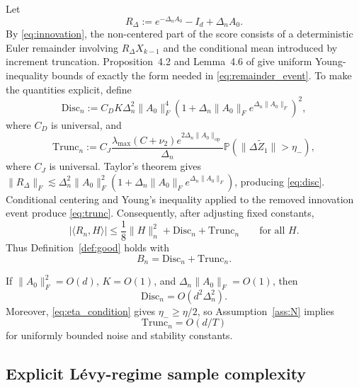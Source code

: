 \documentclass[12pt]{article}
\theoremstyle{definition}
\begin{document}
	Let
	\begin{equation}
		R_\Delta:=e^{-\Delta_nA_0}-I_d+\Delta_nA_0.
		\label{eq:Rdelta}
	\end{equation}
	By \eqref{eq:innovation}, the non-centered part of the score consists of a deterministic Euler remainder involving $R_\Delta X_{k-1}$ and the conditional mean introduced by increment truncation. Proposition~4.2 and Lemma~4.6 of \citet{DexheimerJeszka2026} give uniform Young-inequality bounds of exactly the form needed in \eqref{eq:remainder_event}. To make the quantities explicit, define
	\begin{equation}
		\mathrm{Disc}_n
		:=C_D K\Delta_n^2\|A_0\|_F^4
		\left(1+\Delta_n\|A_0\|_F e^{\Delta_n\|A_0\|_F}\right)^2,
		\label{eq:disc}
	\end{equation}
	where $C_D$ is universal, and
	\begin{equation}
		\mathrm{Trunc}_n
		:=C_J\frac{\lambda_{\max}(C+\nu_2)e^{2\Delta_n\|A_0\|_{\mathrm{op}}}}{\Delta_n}
		\mathbb P\left(\|\Delta\widetilde Z_1\|>\eta_-\right),
		\label{eq:trunc}
	\end{equation}
	where $C_J$ is universal. Taylor's theorem gives
	$\|R_\Delta\|_F\lesssim\Delta_n^2\|A_0\|_F^2(1+\Delta_n\|A_0\|_Fe^{\Delta_n\|A_0\|_F})$, producing \eqref{eq:disc}. Conditional centering and Young's inequality applied to the removed innovation event produce \eqref{eq:trunc}. Consequently, after adjusting fixed constants,
	\begin{equation}
		|\langle R_n,H\rangle|
		\le\frac18\|H\|_n^2
		+\mathrm{Disc}_n+\mathrm{Trunc}_n
		\qquad\text{for all }H.
		\label{eq:remainder_verified}
	\end{equation}
	Thus Definition~\ref{def:good} holds with
	\begin{equation}
		B_n=\mathrm{Disc}_n+\mathrm{Trunc}_n.
		\label{eq:Bn}
	\end{equation}
	
	If $\|A_0\|_F^2=O(d)$, $K=O(1)$, and $\Delta_n\|A_0\|_F=O(1)$, then
	\begin{equation}
		\mathrm{Disc}_n=O(d^2\Delta_n^2).
		\label{eq:disc_order}
	\end{equation}
	Moreover, \eqref{eq:eta_condition} gives $\eta_-\ge\eta/2$, so Assumption~\ref{ass:N} implies
	\begin{equation}
		\mathrm{Trunc}_n=O(d/T)
		\label{eq:trunc_order}
	\end{equation}
	for uniformly bounded noise and stability constants.
	
	\subsection{Explicit L\'evy-regime sample complexity}
	
\end{document}
